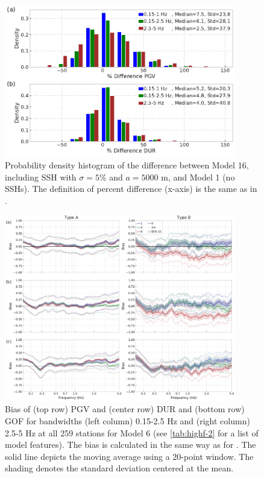 \begin{figure}[!ht]
  \centering
  \includegraphics[width=0.9\textwidth,height=0.9\textheight,keepaspectratio]{figures/figure_highf_11.pdf}
  \caption{Probability density histogram of the difference between Model 16, including SSH with $\sigma = 5\%$ and $a = 5000$ m, and Model 1 (no SSHs). The definition of percent difference (x-axis) is the same as in .
  }
  \label{fig:highf-11}
\end{figure}
\clearpage


\begin{figure}[!ht]
  \centering
  \includegraphics[width=0.9\textwidth,height=0.9\textheight,keepaspectratio]{figures/figure_highf_12.pdf}
  \caption{Bias of (top row) PGV and (center row) DUR and (bottom row) GOF for bandwidths (left column) 0.15-2.5 Hz and (right column) 2.5-5 Hz at all 259 stations for Model 6 (see \cref{tab:highf-2} for a list of model features). The bias is calculated in the same way as for . The solid line depicts the moving average using a 20-point window. The shading denotes the standard deviation centered at the mean.}
  \label{fig:highf-12}
\end{figure}
\clearpage

